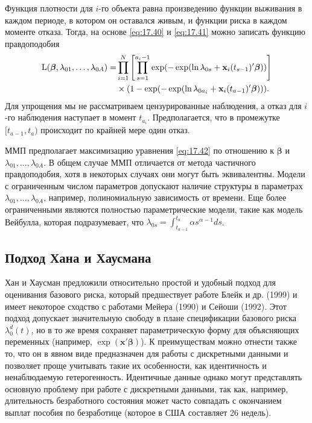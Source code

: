 Функция плотности для $i$-го объекта равна произведению функции выживания в каждом периоде, в котором он оставался живым, и функции риска в каждом моменте отказа. Тогда, на основе \ref{eq:17.40} и \ref{eq:17.41} можно записать функцию правдоподобия
        \begin{align}
        \label{eq:17.42}
        \mathrm{L}(\bm{\beta},\lambda_{01}, \ldots ,\lambda_{0A})=&\prod^{N}_{i=1}\left[\prod^{a_i-1}_{s=1}\exp(-\exp(\ln\lambda_{0s}+\mathbf{x}_i(t_{s-1})'\bm{\beta}))\right]\\
        &\times(1-\exp(-\exp(\ln\lambda_{0a_i}+\mathbf{x}_i(t_{a-1})'\bm{\beta}))).\notag
        \end{align}
Для упрощения мы не рассматриваем цензурированные наблюдения, а отказ для $i$-го наблюдения наступает в момент $t_{a_i}$. Предполагается, что в промежутке $[t_{a-1},t_a)$ происходит по крайней мере один отказ.

ММП предполагает максимизацию уравнения \ref{eq:17.42} по отношению к $\bm{\beta}$ и $\lambda_{01}, \ldots ,\lambda_{0A}$. В общем случае ММП отличается от метода частичного правдоподобия, хотя в некоторых случаях они могут быть эквивалентны. Модели с ограниченным числом параметров допускают наличие структуры в параметрах $\lambda_{01}, \ldots ,\lambda_{0A}$, например, полиномиальную зависимость от времени. Еще более ограниченными являются полностью параметрические модели, такие как модель Вейбулла, которая подразумевает, что $\lambda_{0s}=\int^{t_a}_{t_{a-1}}\alpha s^{\alpha-1}ds$.


\subsection{Подход Хана и Хаусмана}\label{sec:17.10.2}

\noindent
Хан и Хаусман предложили относительно простой и удобный подход для оценивания базового риска, который предшествует работе Блейк и др. (1999) и имеет некоторое сходство с работами Мейера (1990) и Сейоши (1992). Этот подход допускает значительную свободу в плане спецификации базового риска $\lambda^{d}_{0}(t)$, но в то же время сохраняет параметрическую форму для объясняющих переменных (например, $\exp(\mathbf{x}'\bm{\beta})$). К преимуществам можно отнести также то, что он в явном виде предназначен для работы с дискретными данными и позволяет проще учитывать такие их особенности, как идентичность и ненаблюдаемую гетерогенность. Идентичные данные однако могут представлять основную проблему при работе с дискретными данными, так как, например, длительность безработного состояния может часто совпадать с окончанием выплат пособия по безработице (которое в США составляет 26 недель).


